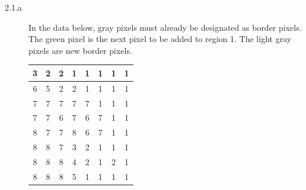 \documentclass[fleqn]{article}
\begin{document}
\begin{description}
\item [2.1.a]
    In the data below, gray pixels must already be designated as border pixels. The green pixel is the next pixel to be added to region 1. The light gray pixels are new border pixels.

    \begin{tabular}{| c | c | c | c | c | c | c | c |}
        \hline
        3 & 2 & 2 & \cellcolor{orange} 1 & \cellcolor{orange} 1 & \cellcolor{orange} 1 & \cellcolor{orange} 1 & \cellcolor{orange} 1 \\ \hline
        \cellcolor{orange} 6 & 5 & \cellcolor{gray} 2 & \cellcolor{gray} 2 & \cellcolor{orange} 1 & \cellcolor{orange} 1 & \cellcolor{orange} 1 & \cellcolor{orange} 1 \\ \hline
        \cellcolor{orange} 7 & \cellcolor{orange} 7 & \cellcolor{orange} 7 & \cellcolor{gray} 7 & \cellcolor{lightgray} 7 & \cellcolor{orange} 1 & \cellcolor{orange} 1 & \cellcolor{orange} 1 \\ \hline
        \cellcolor{orange} 7 & \cellcolor{orange} 7 & \cellcolor{orange} 6 & \cellcolor{green} 7 & \cellcolor{lightgray} 6 & 7 & \cellcolor{orange} 1 & \cellcolor{orange} 1 \\ \hline
        \cellcolor{orange} 8 & \cellcolor{orange} 7 & \cellcolor{orange} 7 & \cellcolor{gray} 8 & \cellcolor{lightgray} 6 & 7 & \cellcolor{orange} 1 & \cellcolor{orange} 1 \\ \hline
        \cellcolor{orange} 8 & \cellcolor{orange} 8 & \cellcolor{orange} 7 & \cellcolor{gray} 3 & \cellcolor{orange} 2 & \cellcolor{orange} 1 & \cellcolor{orange} 1 & \cellcolor{orange} 1 \\ \hline
        \cellcolor{orange} 8 & \cellcolor{orange} 8 & \cellcolor{orange} 8 & \cellcolor{gray} 4 & \cellcolor{orange} 2 & \cellcolor{orange} 1 & \cellcolor{orange} 2 & \cellcolor{orange} 1 \\ \hline
        \cellcolor{orange} 8 & \cellcolor{orange} 8 & \cellcolor{orange} 8 & \cellcolor{gray} 5 & \cellcolor{orange} 1 & \cellcolor{orange} 1 & \cellcolor{orange} 1 & \cellcolor{orange} 1 \\ \hline
    \end{tabular}


\end{description}
\end{document}
